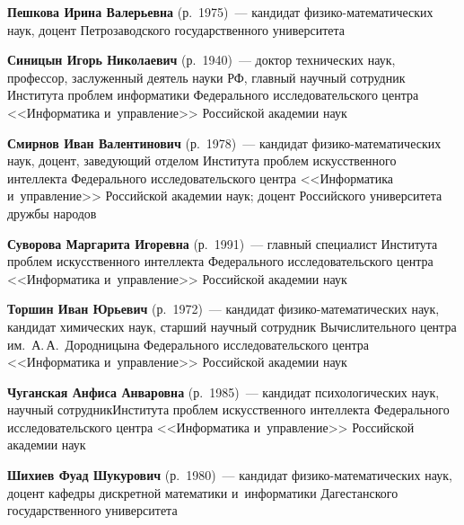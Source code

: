 \begin{multicols}{2}
\vspace*{3pt}

\noindent
\textbf{Пешкова Ирина Валерьевна} (р.\ 1975)~--- кандидат
фи\-зи\-ко-ма\-те\-ма\-ти\-че\-ских наук, доцент Петрозаводского государственного университета

\vspace*{3pt}

\noindent
\textbf{Синицын Игорь Николаевич} (р.\ 1940)~--- 
доктор технических наук, профессор, заслуженный деятель науки РФ,
 главный научный со\-труд\-ник Института проб\-лем информатики Федерального исследовательского цент\-ра 
 <<Информатика и~управ\-ле\-ние>> Российской академии наук
 
 \noindent
\textbf{Смирнов Иван Валентинович} (р.\ 1978)~--- 
кандидат фи\-зи\-ко-ма\-те\-ма\-ти\-че\-ских наук, доцент, 
за\-ве\-ду\-ющий отделом Института проб\-лем искусственного интеллекта 
Федерального исследовательского цент\-ра <<Информатика и~управ\-ле\-ние>>
Российской академии наук; доцент Российского университета дружбы народов

\vspace*{3pt}

\noindent
\textbf{Суворова Маргарита Игоревна} (р.\ 1991)~--- 
главный специалист Института проб\-лем искусственного интеллекта Федерального исследовательского цент\-ра 
<<Информатика и~управ\-ле\-ние>> Российской академии наук

\vspace*{3pt}

\noindent
\textbf{Торшин Иван Юрьевич} (р.\ 1972)~--- 
кандидат фи\-зи\-ко-ма\-те\-ма\-ти\-че\-ских наук, 
кандидат химических наук, старший научный сотрудник Вычислительного центра им.\
 А.\,А.~Дородницына Федерального исследовательского цент\-ра <<Информатика и~управ\-ле\-ние>>
  Российской академии наук

\vspace*{3pt}

\noindent
\textbf{Чуганская Анфиса Анваровна} (р.\ 1985)~--- 
кандидат психологических наук, научный сотрудник\linebreak Института проб\-лем искусственного интеллекта 
Федерального исследовательского цент\-ра <<Информатика и~управ\-ле\-ние>> Российской академии наук

\vspace*{3pt}



\noindent
\textbf{Шихиев Фуад Шукурович} (р.\ 1980)~--- кандидат фи\-зи\-ко-ма\-те\-ма\-ти\-че\-ских наук,
 доцент ка\-фед\-ры дис\-крет\-ной математики и~информатики Дагестанского государственного университета
 

\end{multicols}
